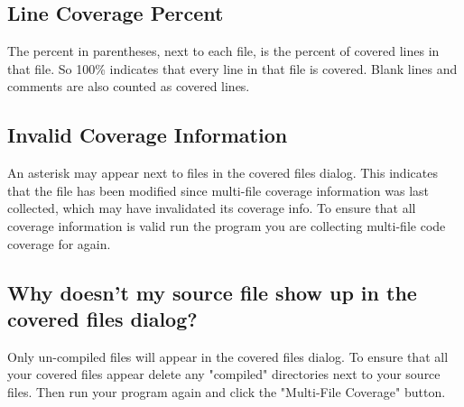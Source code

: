 \documentclass{article}
\newcommand{\postDoc}{}
\begin{document}
\subsection[Line Coverage Percent]{Line Coverage Percent}\label{t:x28part_x22Linex5fCoveragex5fPercentx22x29}

The percent in parentheses, next to each file, is the percent of covered lines in that file. So 100\% indicates that every line in that file is covered. Blank lines and comments are also counted as covered lines.

\subsection[Invalid Coverage Information]{Invalid Coverage Information}\label{t:x28part_x22Invalidx5fCoveragex5fInformationx22x29}

An asterisk may appear next to files in the covered files dialog. This indicates that the file has been modified since multi{-}file coverage information was last collected, which may have invalidated its coverage info. To ensure that all coverage information is valid run the program you are collecting multi{-}file code coverage for again.

\subsection[Why doesn{'}t my source file show up in the covered files dialog?]{Why doesn{'}t my source file show up in the covered files dialog?}\label{t:x28part_x22Whyx5fdoesnx5ftx5fmyx5fsourcex5ffilex5fshowx5fupx5finx5fthex5fcoveredx5ffilesx5fdialogx5fx22x29}

Only un{-}compiled files will appear in the covered files dialog. To ensure that all your covered files appear delete any "compiled" directories next to your source files. Then run your program again and click the "Multi{-}File Coverage" button.

\postDoc
\end{document}
